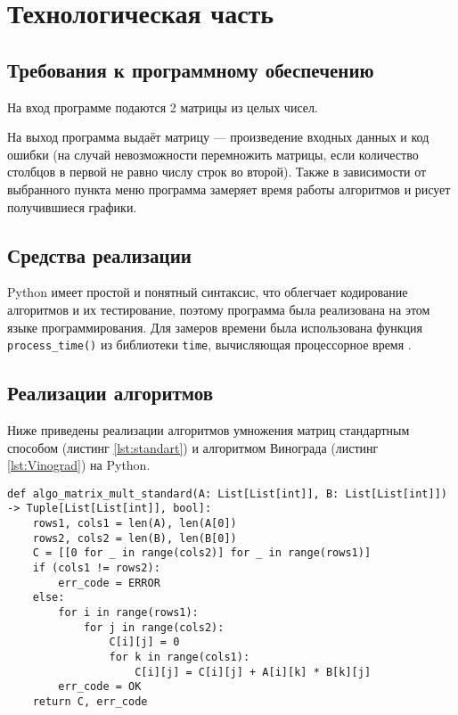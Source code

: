 \section{Технологическая часть}
\subsection{Требования к программному обеспечению}

\hspace{1.20cm}
На вход программе подаются 2 матрицы из целых чисел.

На выход программа выдаёт матрицу --- произведение входных данных и код ошибки (на случай невозможности перемножить матрицы, если количество столбцов в первой не равно числу строк во второй). Также в зависимости от выбранного пункта меню программа замеряет время работы алгоритмов и рисует получившиеся графики.

\subsection{Средства реализации}

\hspace{1.25cm}
Python имеет простой и понятный синтаксис, что облегчает кодирование алгоритмов и их тестирование, поэтому программа была реализована на этом языке программирования. Для замеров времени была использована функция \texttt{process\_time()} из библиотеки \texttt{time}, вычисляющая процессорное время \cite{process_time}.

\subsection{Реализации алгоритмов}

\hspace{1.25cm}
Ниже приведены реализации алгоритмов умножения матриц стандартным способом (листинг \ref{lst:standart}) и алгоритмом Винограда (листинг \ref{lst:Vinograd}) на Python.

\vspace{0.25cm}
\begin{lstlisting}[caption=реализация стандартного алгоритма умножения матриц, label=lst:standart]
def algo_matrix_mult_standard(A: List[List[int]], B: List[List[int]]) -> Tuple[List[List[int]], bool]:
    rows1, cols1 = len(A), len(A[0])
    rows2, cols2 = len(B), len(B[0])
    C = [[0 for _ in range(cols2)] for _ in range(rows1)]
    if (cols1 != rows2):
        err_code = ERROR
    else:
        for i in range(rows1):
            for j in range(cols2):
                C[i][j] = 0
                for k in range(cols1):
                    C[i][j] = C[i][j] + A[i][k] * B[k][j]
        err_code = OK
    return C, err_code
\end{lstlisting}

